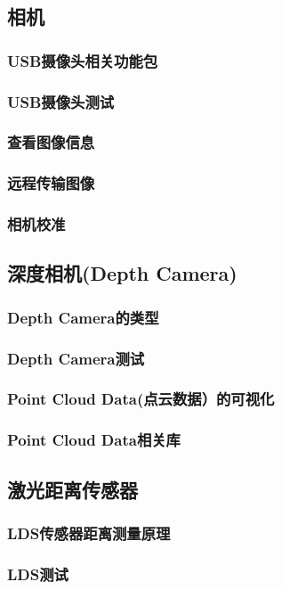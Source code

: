 \documentclass[geye,green,kindle,cn]{elegantnote}
\begin{document}
\subsection{相机}
\subsubsection{USB摄像头相关功能包}
\subsubsection{USB摄像头测试}
\subsubsection{查看图像信息}
\subsubsection{远程传输图像}
\subsubsection{相机校准}
\subsection{深度相机(Depth Camera)}
\subsubsection{Depth Camera的类型}
\subsubsection{Depth Camera测试}
\subsubsection{Point Cloud Data(点云数据）的可视化}
\subsubsection{Point Cloud Data相关库}
\subsection{激光距离传感器}
\subsubsection{LDS传感器距离测量原理}
\subsubsection{LDS测试}
\end{document}
